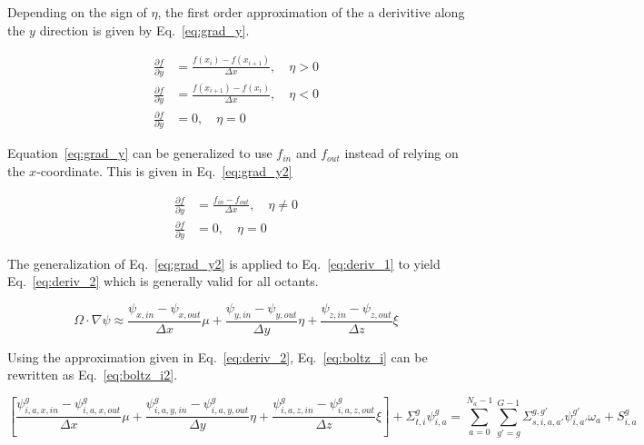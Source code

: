 Depending on the sign of $\eta$, the first order approximation of the a derivitive along the $y$ direction is given by Eq.~\ref{eq:grad_y}.

\begin{equation} \label{eq:grad_y}
\begin{split}
\frac{\partial f}{\partial y} &= \frac{f(x_i) - f(x_{i+1})}{\Delta x}, \quad \eta>0 \\
\frac{\partial f}{\partial y} &= \frac{f(x_{i+1}) - f(x_{i})}{\Delta x}, \quad \eta <0 \\
\frac{\partial f}{\partial y} &= 0, \quad \eta=0
\end{split}
\end{equation}

Equation~\ref{eq:grad_y} can be generalized to use $f_{in}$ and $f_{out}$ instead of relying on the $x$-coordinate. This is given in Eq.~\ref{eq:grad_y2}

\begin{equation} \label{eq:grad_y2}
\begin{split}
\frac{\partial f}{\partial y} &= \frac{f_{in} - f_{out}}{\Delta x}, \quad \eta \neq 0 \\
\frac{\partial f}{\partial y} &= 0, \quad \eta=0
\end{split}
\end{equation}

The generalization of Eq.~\ref{eq:grad_y2} is applied to Eq.~\ref{eq:deriv_1} to yield Eq.~\ref{eq:deriv_2} which is generally valid for all octants.

\begin{equation} \label{eq:deriv_2}
\Omega \cdot \nabla \psi \approx 
\frac{\psi_{x,in} - \psi_{x,out}}{\Delta x} \mu + 
\frac{\psi_{y,in} - \psi_{y,out}}{\Delta y} \eta + 
\frac{\psi_{z,in} - \psi_{z,out}}{\Delta z} \xi
\end{equation}

Using the approximation given in Eq.~\ref{eq:deriv_2}, Eq.~\ref{eq:boltz_i} can be rewritten as Eq.~\ref{eq:boltz_i2}.

\begin{equation} \label{eq:boltz_i2}
\left[ 
\frac{\psi_{i,a,x,in}^g - \psi_{i,a,x,out}^g}{\Delta x} \mu + 
\frac{\psi_{i,a,y,in}^g - \psi_{i,a,y,out}^g}{\Delta y} \eta + 
\frac{\psi_{i,a,z,in}^g - \psi_{i,a,z,out}^g}{\Delta z} \xi
\right]
+ \Sigma_{t,i}^g \psi_{i,a}^{g} = 
\sum_{a=0}^{N_a-1} \sum_{g'=g}^{G-1} \Sigma_{s, i, a, a'}^{g, g'} \psi_{i, a'}^{g'} \omega_a + S_{i,a}^g
\end{equation}


